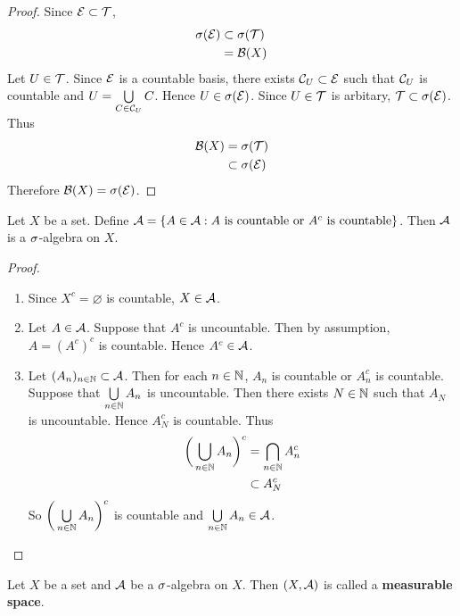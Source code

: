 \documentclass{book}
\begin{document}
	\begin{proof}
		Since $\mathcal{E} \subset \mathcal{T}$, 
		\begin{align*}
			\sigma(\mathcal{E})
			& \subset \sigma(\mathcal{T}) \\
			& = \mathcal{B}(X)
		\end{align*}
		Let $U \in \mathcal{T}$. Since $\mathcal{E}$ is a countable basis, there exists $\mathcal{C}_U \subset \mathcal{E}$ such that $\mathcal{C}_U$ is countable and $U = \bigcup\limits_{C \in \mathcal{C}_U}C$. Hence $U \in \sigma(\mathcal{E})$. Since $U \in \mathcal{T}$ is arbitary, $\mathcal{T} \subset \sigma(\mathcal{E})$. Thus 
		\begin{align*}
			\mathcal{B}(X) 
			& = \sigma(\mathcal{T}) \\
			& \subset \sigma(\mathcal{E})
		\end{align*} 
		Therefore $\mathcal{B}(X) = \sigma(\mathcal{E})$.
	\end{proof}
	
	\begin{ex}  
		Let $X$ be a set. Define $\mathcal{A} = \{A \in \mathcal{A}: A \text{ is countable or }A^c  \text{ is countable}\}$. Then $\mathcal{A}$ is a $\sigma$-algebra on $X$.
	\end{ex}
	
	\begin{proof}\
		\begin{enumerate}
			\item Since $X^c = \varnothing$ is countable, $X \in \mathcal{A}$.
			\item Let $A \in \mathcal{A}$. Suppose that $A^c$ is  uncountable. Then by assumption, $A = (A^c)^c$ is countable. Hence $A^c \in \mathcal{A}$.
			\item Let $(A_n)_{n \in \mathbb{N}} \subset \mathcal{A}$. Then for each $n \in \mathbb{N}$, $A_n$ is countable or $A_n^c$ is countable. Suppose that $\bigcup\limits_{n \in \mathbb{N}}A_n$ is uncountable. Then there exists $N \in \mathbb{N}$ such that $A_N$ is uncountable. Hence $A_N^c$ is countable. Thus 
			\begin{align*}
				\bigg(\bigcup_{n \in \mathbb{N}}A_n \bigg)^c 
				&= \bigcap_{n \in \mathbb{N}}A_n^c \\
				& \subset A_N^c 
			\end{align*}
			So $\bigg(\bigcup\limits_{n \in \mathbb{N}}A_n \bigg)^c $ is countable and $\bigcup\limits_{n \in \mathbb{N}}A_n \in \mathcal{A}$. 
		\end{enumerate}
	\end{proof}


	\begin{defn} 
		Let $X$ be a set and $\mathcal{A}$ be a $\sigma$-algebra on $X$. Then $(X, \mathcal{A})$ is called a \textbf{measurable space}.
	\end{defn}
\end{document}
